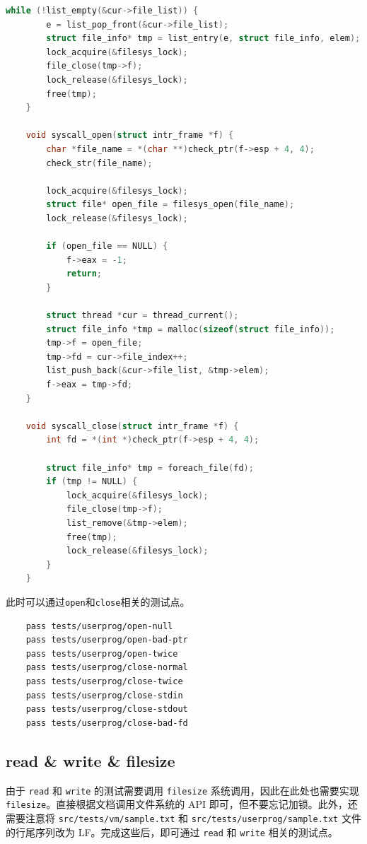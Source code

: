 \documentclass{article}
\begin{document}
\begin{lstlisting}[language=C]
	while (!list_empty(&cur->file_list)) { 
		e = list_pop_front(&cur->file_list); 
		struct file_info* tmp = list_entry(e, struct file_info, elem); 
		lock_acquire(&filesys_lock); 
		file_close(tmp->f); 
		lock_release(&filesys_lock); 
		free(tmp); 
	}
	
	void syscall_open(struct intr_frame *f) { 
		char *file_name = *(char **)check_ptr(f->esp + 4, 4); 
		check_str(file_name);
		
		lock_acquire(&filesys_lock); 
		struct file* open_file = filesys_open(file_name); 
		lock_release(&filesys_lock);
		
		if (open_file == NULL) { 
			f->eax = -1; 
			return; 
		}
		
		struct thread *cur = thread_current(); 
		struct file_info *tmp = malloc(sizeof(struct file_info)); 
		tmp->f = open_file; 
		tmp->fd = cur->file_index++; 
		list_push_back(&cur->file_list, &tmp->elem); 
		f->eax = tmp->fd; 
	}
	
	void syscall_close(struct intr_frame *f) { 
		int fd = *(int *)check_ptr(f->esp + 4, 4);
		
		struct file_info* tmp = foreach_file(fd); 
		if (tmp != NULL) { 
			lock_acquire(&filesys_lock); 
			file_close(tmp->f); 
			list_remove(&tmp->elem); 
			free(tmp); 
			lock_release(&filesys_lock); 
		}
	}
\end{lstlisting}

此时可以通过\texttt{open}和\texttt{close}相关的测试点。

\begin{lstlisting}
	pass tests/userprog/open-null
	pass tests/userprog/open-bad-ptr
	pass tests/userprog/open-twice
	pass tests/userprog/close-normal
	pass tests/userprog/close-twice
	pass tests/userprog/close-stdin
	pass tests/userprog/close-stdout
	pass tests/userprog/close-bad-fd
\end{lstlisting}

\subsection{read \& write \& filesize}

由于 \texttt{read} 和 \texttt{write} 的测试需要调用 \texttt{filesize} 系统调用，因此在此处也需要实现 \texttt{filesize}。直接根据文档调用文件系统的 API 即可，但不要忘记加锁。此外，还需要注意将 \texttt{src/tests/vm/sample.txt} 和 \texttt{src/tests/userprog/sample.txt} 文件的行尾序列改为 LF。完成这些后，即可通过 \texttt{read} 和 \texttt{write} 相关的测试点。
\end{document}
